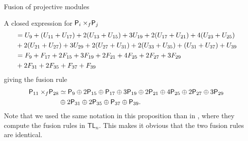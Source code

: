 \documentclass[reqno]{amsart}
\newcommand{\tl}[1]{\mathsf{TL}_{#1}}
\newcommand{\dP}[1]{\mathsf P_{#1}}
\newcommand{\xf}{\times\hspace{-0.27em}_f}
\newcommand{\F}[1]{F_{#1}}
\newcommand{\U}[1]{U_{#1}}
\begin{document}
\begin{section}{Fusion of projective modules}
\begin{subsection}{A closed expression for $\dP{i} \xf \dP{j}$}
\begin{align}
& = \U{9} + (\U{11} + \U{17}) + 2(\U{13} + \U{15}) + 3 \U{19} + 2 (\U{17} + \U{21}) + 4(\U{23} + \U{25})\notag\\
& + 2 (\U{21}+\U{27}) + 3\U{29} + 2(\U{27}+\U{31}) + 2(\U{33}+\U{35}) + (\U{31} + \U{37}) + \U{39}\notag\\
& = \F{9} + \F{17} + 2 \F{15} + 3\F{19}+ 2 \F{21} + 4 \F{25} + 2\F{27} + 3\F{29}\notag\\
& +2\F{31}+2\F{35} + \F{37} + \F{39}
\end{align}
giving the fusion rule
\begin{align}
\dP{11} \xf \dP{28} &  \simeq \dP{9}\oplus 2\dP{15}\oplus \dP{17} \oplus 3\dP{19} \oplus 2\dP{21} \oplus 4\dP{25} \oplus 2\dP{27} \oplus 3\dP{29} \notag\\
& \oplus 2 \dP{31} \oplus 2 \dP{35} \oplus \dP{37} \oplus \dP{39}.
\end{align}
Note that we used the same notation in this proposition than in \cite{GainVass}, where they compute the fusion rules in $\tl{n}$. This makes it obvious that the two fusion rules are identical.%


\end{subsection}
\end{section}
\end{document}
